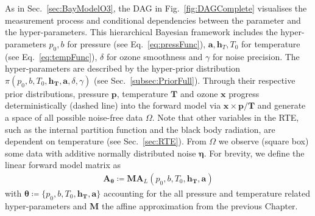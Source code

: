 As in Sec.~\ref{sec:BayModelO3}, the DAG in Fig.~\ref{fig:DAGComplete} visualises the measurement process and conditional dependencies between the parameter and the hyper-parameters.
This hierarchical Bayesian framework includes the hyper-parameters $p_0, b$ for pressure (see Eq.~\ref{eq:pressFunc}), $\bm{a}, \bm{h}_T, T_0$ for temperature (see Eq.~\ref{eq:tempFunc}), $\delta$ for ozone smoothness and $\gamma$ for noise precision.
The hyper-parameters are described by the hyper-prior distribution $\pi(p_0,b,T_0,\bm{h_T},\bm{a}, \delta,\gamma)$ (see Sec.~\ref{subsec:PriorFull}).
Through their respective prior distributions, pressure $\bm{p}$, temperature $\bm{T}$ and ozone $\bm{x}$ progress deterministically (dashed line) into the forward model via $\bm{x} \times \bm{p} / \bm{T}$ and generate a space of all possible noise-free data $\Omega$.
Note that other variables in the RTE, such as the internal partition function and the black body radiation, are dependent on temperature (see Sec.~\ref{sec:RTE}).
From $\Omega$ we observe (square box) some data with additive normally distributed noise $\bm{\eta}$.
For brevity, we define the linear forward model matrix as
\begin{align}
	\bm{A}_{\bm{\theta}} \coloneqq \bm{M}\bm{A}_L(p_0,b,T_0,\bm{h_T},\bm{a}) 
\end{align}
with $\bm{\theta}  \coloneqq \{p_0,b,T_0,\bm{h_T},\bm{a}  \}$ accounting for the all pressure and temperature related hyper-parameters and $\bm{M}$ the affine approximation from the previous Chapter.

